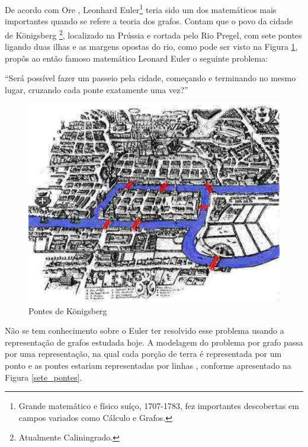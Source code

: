 De acordo com Ore \cite{Ore:1963}, Leonhard Euler\footnote{Grande matemático e físico suíço, 1707-1783, fez importantes descobertas em campos variados como Cálculo e Grafos.} teria sido um dos matemáticos mais importantes quando se refere a teoria dos grafos. Contam que o povo da cidade de Königsberg \footnote{Atualmente Caliningrado.}, localizado na Prússia e cortada pelo Rio Pregel, com sete pontes ligando duas ilhas e as margens opostas do rio, como pode ser visto na Figura \ref{Konigsberg}, propôs ao então famoso matemático Leonard Euler o seguinte problema:

	``Será possível fazer um passeio pela cidade, começando e
	terminando no mesmo lugar, cruzando cada ponte exatamente uma vez?''

\begin{figure}[!h]
	\centering
	\includegraphics[scale=0.35]{figuras/capitulo2/Konigsberg.eps}
	\caption[Pontes de Königsberg]{Pontes de Königsberg\footnotemark}
	\label{Konigsberg}
\end{figure}

Não se tem conhecimento sobre o Euler ter resolvido esse problema usando a representação de grafos estudada hoje. A modelagem do problema por grafo passa por uma representação, na qual cada porção de terra  é representada por um ponto e as pontes estariam representadas por linhas \cite{Ore:1963}, conforme apresentado na Figura \ref{sete_pontes}.

